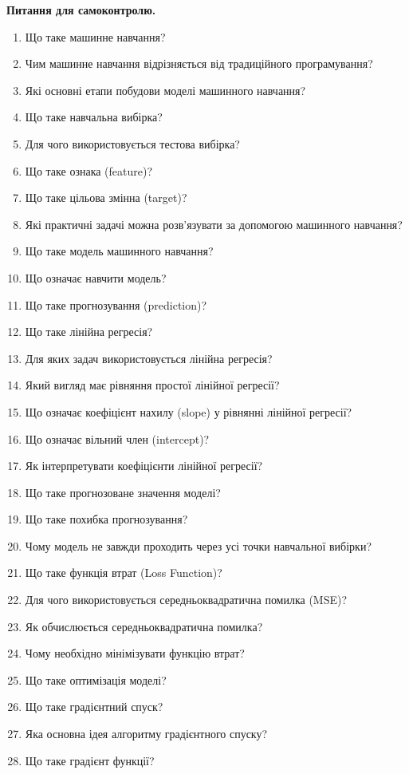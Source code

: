  \textbf{Питання для самоконтролю.}

\begin{enumerate}
\item Що таке машинне навчання?
\item Чим машинне навчання відрізняється від традиційного програмування?
\item Які основні етапи побудови моделі машинного навчання?
\item Що таке навчальна вибірка?
\item Для чого використовується тестова вибірка?
\item Що таке ознака (feature)?
\item Що таке цільова змінна (target)?
\item Які практичні задачі можна розв'язувати за допомогою машинного навчання?
\item Що таке модель машинного навчання?
\item Що означає навчити модель?
\item Що таке прогнозування (prediction)?
\item Що таке лінійна регресія?
\item Для яких задач використовується лінійна регресія?
\item Який вигляд має рівняння простої лінійної регресії?
\item Що означає коефіцієнт нахилу (slope) у рівнянні лінійної регресії?
\item Що означає вільний член (intercept)?
\item Як інтерпретувати коефіцієнти лінійної регресії?
\item Що таке прогнозоване значення моделі?
\item Що таке похибка прогнозування?
\item Чому модель не завжди проходить через усі точки навчальної вибірки?
\item Що таке функція втрат (Loss Function)?
\item Для чого використовується середньоквадратична помилка (MSE)?
\item Як обчислюється середньоквадратична помилка?
\item Чому необхідно мінімізувати функцію втрат?
\item Що таке оптимізація моделі?
\item Що таке градієнтний спуск?
\item Яка основна ідея алгоритму градієнтного спуску?
\item Що таке градієнт функції?

\end{enumerate}
